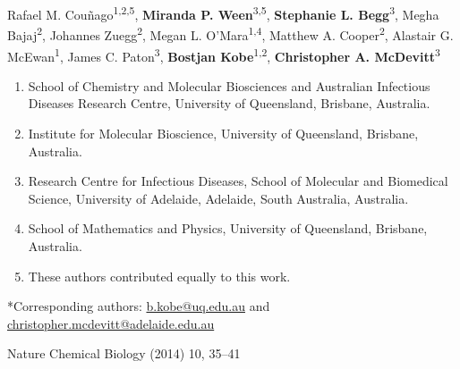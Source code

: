 Rafael M. Couñago\textsuperscript{1,2,5}, \textbf{Miranda P. Ween}\textsuperscript{3,5}, \textbf{Stephanie L. Begg}\textsuperscript{3}, Megha Bajaj\textsuperscript{2}, Johannes Zuegg\textsuperscript{2}, Megan L. O’Mara\textsuperscript{1,4}, Matthew A. Cooper\textsuperscript{2}, Alastair G. McEwan\textsuperscript{1}, James C. Paton\textsuperscript{3}, \textbf{Bostjan Kobe}\textsuperscript{1,2}, \textbf{Christopher A. McDevitt}\textsuperscript{3}
\begin{enumerate}
\item School of Chemistry and Molecular Biosciences and Australian Infectious Diseases Research Centre, University of Queensland, Brisbane, Australia.
\item Institute for Molecular Bioscience, University of Queensland, Brisbane, Australia.
\item Research Centre for Infectious Diseases, School of Molecular and Biomedical Science, University of Adelaide, Adelaide, South Australia, Australia.
\item School of Mathematics and Physics, University of Queensland, Brisbane, Australia.
\item These authors contributed equally to this work.
\end{enumerate}

*Corresponding authors: \href{mailto:b.kobe@uq.edu.au}{b.kobe@uq.edu.au} and \href{mailto:christopher.mcdevitt@adelaide.edu.au}{christopher.mcdevitt@adelaide.edu.au} 

Nature Chemical Biology (2014) 10, 35–41